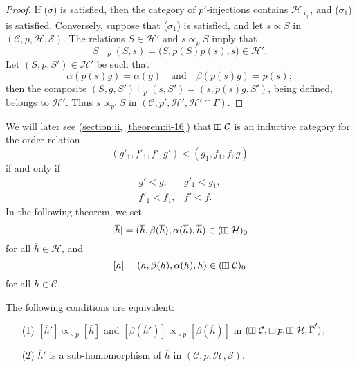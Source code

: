 \documentclass[a4paper,fleqn]{article}
\theoremstyle{plain}
\newenvironment{theorem}[1]
  {\renewcommand\theinnertheorem{#1}\innertheorem}
  {\endinnertheorem}
\theoremstyle{definition}
\newcommand{\oldpage}[1]{{\marginpar{\footnotesize$\bigg\vert$\,\,\,\,\textit{p.~#1}}}}
\newcommand{\textand}{\quad\text{and}\quad}
\newcommand{\CC}{\mathcal{C}}
\newcommand{\HH}{\mathcal{H}}
\renewcommand{\SS}{\mathcal{S}}
\newcommand{\subs}{\mathrel{\propto}}
\newcommand{\vsqbox}{{\rotatebox{90}{$\boxminus$}}}
\DeclareMathOperator{\sq}{\square}
\DeclareMathOperator{\vsq}{\raisebox{-.1em}{$\vsqbox$\,}}
\begin{document}
\begin{proof}
  If ($\sigma$) is satisfied, then the category of $p'$-injections contains $\HH_{\subs_p}$, and ($\sigma_1$) is satisfied.
  Conversely, suppose that ($\sigma_1$) is satisfied, and let $s\subs S$ in $(\CC,p,\HH,\SS)$.
  The relations $S\in\HH'$ and $s\subs_p S$ imply that
  \[
    S\vdash_p(S,s)
    = \big(
      S,p(S)p(s),s
    \big) \in \HH'.
  \]
  Let $(S,p,S')\in\HH'$ be such that
  \[
    \alpha(p(s)g) = \alpha(g)
    \textand
    \beta(p(s)g) = p(s);
  \]
  then the composite $(S,g,S')\vdash_p(s,S')=(s,p(s)g,S')$, being defined, belongs to $\HH'$.
  Thus $s\subs_{p'}S$ in $(\CC,p',\HH',\HH'\cap\Gamma)$.
\end{proof}

We will later see (\hyperref[§II]{section:ii}, \cref{theorem:ii-16}) that $\vsq\CC$ is an inductive category for the order relation
\[
  (g'_1,f'_1,f',g')
  < (g_1,f_1,f,g)
\]
\oldpage{368}
if and only if
\[
  \begin{array}{ll}
    g'<g,
    & g'_1<g_1,
  \\f'_1<f_1,
    & f'<f.
  \end{array}
\]
In the following theorem, we set
\[
  [\overline{h}]
  = (\overline{h},\beta(\overline{h}),\alpha(\overline{h}),\overline{h})
  \in (\vsq\HH)_0
\]
for all $\overline{h}\in\HH$, and
\[
  [h]
  = (h,\beta(h),\alpha(h),h)
  \in (\vsq\CC)_0
\]
for all $h\in\CC$.

\begin{theorem}{2}
\label{theorem:i-2}
  The following conditions are equivalent:
  \begin{enumerate}
    \item[\normalfont(1)] $[\overline{h}']\subs_{\sq p}[\overline{h}]$ and $[\beta(\overline{h}')]\subs_{\sq p}[\beta(\overline{h})]$ in $(\vsq\CC,\sq p,\vsq\HH,\overline{\Gamma}')$;
    \item[\normalfont(2)] $\overline{h}'$ is a sub-homomorphism of $\overline{h}$ in $(\CC,p,\HH,\SS)$.
  \end{enumerate}
\end{theorem}
\end{document}
